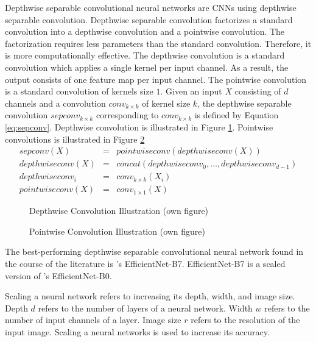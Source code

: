 Depthwise separable convolutional neural networks are \ac{CNN}s using depthwise separable convolution.
Depthwise separable convolution factorizes a standard convolution into a depthwise convolution and a pointwise convolution. The factorization requires less parameters than the standard convolution. Therefore, it is more computationally effective. The depthwise convolution is a standard convolution which applies a single kernel per input channel. As a result, the output consists of one feature map per input channel. The pointwise convolution is a standard convolution of kernels size $1$. Given an input $X$ consisting of $d$ channels and a convolution $conv_{k \times k}$ of kernel size $k$, the depthwise separable convolution $sepconv_{k \times k}$ corresponding to $conv_{k \times k}$ is defined by Equation \eqref{eq:sepconv}. \autocites{Guo.2019}{Chollet.2017}
Depthwise convolution is illustrated in Figure \ref{fig:depthconv}. Pointwise convolutions is illustrated in Figure \ref{fig:pointconv}
\begin{equation}
	\label{eq:sepconv}
	\begin{array}{lcl}
		sepconv(X) & = & pointwiseconv(depthwiseconv(X))\\
		depthwiseconv(X) & = & concat(depthwiseconv_0, \dots, depthwiseconv_{d-1})\\
		depthwiseconv_i & = & conv_{k \times k}(X_i)\\
		pointwiseconv(X) & = & conv_{1 \times 1}(X)
	\end{array}
\end{equation}
\begin{figure}[H]
	\centering
	
	\caption{Depthwise Convolution Illustration (own figure)}
	\label{fig:depthconv}
\end{figure}
\begin{figure}[H]
	\centering
	
	\caption{Pointwise Convolution Illustration (own figure)}
	\label{fig:pointconv}
\end{figure}
\par
The best-performing depthwise separable convolutional neural network found in the course of the literature is \cite{Tan.2019}'s EfficientNet-B7.
EfficientNet-B7 is a scaled version of \cite{Tan.2019}'s EfficientNet-B0.
\par %
Scaling a neural network refers to increasing its depth, width, and image size. Depth $d$ refers to the number of layers of a neural network. Width $w$ refers to the number of input channels of a layer. Image size $r$ refers to the resolution of the input image. Scaling a neural networks is used to increase its accuracy.\autocite{Tan.2019}
